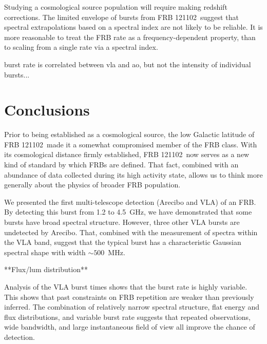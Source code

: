 \documentclass[twocolumn]{aastex61}
\newcommand{\frb}{FRB 121102}
\begin{document}
Studying a cosmological source population will require making redshift corrections. The limited envelope of bursts from \frb\ suggest that spectral extrapolations based on a spectral index are not likely to be reliable. It is more reasonable to treat the FRB rate as a frequency-dependent property, than to scaling from a single rate via a spectral index.

burst rate is correlated between vla and ao, but not the intensity of individual bursts...


\section{Conclusions}
Prior to being established as a cosmological source, the low Galactic latitude of \frb\ made it a somewhat compromised member of the FRB class. With its cosmological distance firmly established, \frb\ now serves as a new kind of standard by which FRBs are defined. That fact, combined with an abundance of data collected during its high activity state, allows us to think more generally about the physics of broader FRB population.

We presented the first multi-telescope detection (Arecibo and VLA) of an FRB. By detecting this burst from 1.2 to 4.5~GHz, we have demonstrated that some bursts have broad spectral structure. However, three other VLA bursts are undetected by Arecibo. That, combined with the measurement of spectra within the VLA band, suggest that the typical burst has a characteristic Gaussian spectral shape with width $\sim500$\ MHz.

**Flux/lum distribution**

Analysis of the VLA burst times shows that the burst rate is highly variable. This shows that past constraints on FRB repetition are weaker than previously inferred. The combination of relatively narrow spectral structure, flat energy and flux distributions, and variable burst rate suggests that repeated observations, wide bandwidth, and large instantaneous field of view all improve the chance of detection. 
\end{document}
